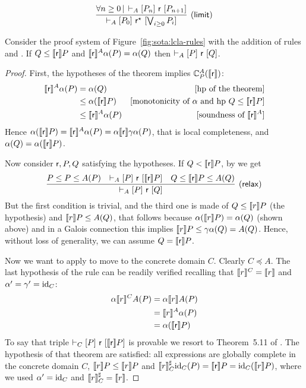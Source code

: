 \[\infer[(\mathsf{limit})]
{\lcl{A}{P_0}{\regr^\kstar}{\bigvee_{i \ge 0}P_i}}
{\forall n \ge 0 \svert \lcl{A}{P_n}{\regr}{P_{n+1}}}
\]
\begin{theorem}\label{th:lcla:refinement-rule-completeness}
	Consider the proof system of Figure~\ref{fig:sota:lcla-rules} with the addition of rules  and . If $Q \le \llbracket\mathsf{r}\rrbracket P$ and $\llbracket\mathsf{r}\rrbracket^A \alpha(P) = \alpha(Q)$ then $\vdash_{A}\nobreak[P]~\mathsf{r}~[Q]$.
\end{theorem}
\begin{proof}
	First, the hypotheses of the theorem implies $\mathbb{C}^{A}_{P}(\llbracket\mathsf{r}\rrbracket)$:
	\begin{align*}
		\llbracket\mathsf{r}\rrbracket^A \alpha(P) & = \alpha(Q)                   & [\text{hp of the theorem}]                                             \\
		                          & \le \alpha(\llbracket\mathsf{r}\rrbracket P)   & [\text{monotonicity of } \alpha \text{ and hp } Q \le \llbracket\mathsf{r}\rrbracket P] \\
		                          & \le \llbracket\mathsf{r}\rrbracket^A \alpha(P) & [\text{soundness of } \llbracket\mathsf{r}\rrbracket^{A}]
	\end{align*}
	Hence $\alpha(\llbracket\mathsf{r}\rrbracket P) = \llbracket\mathsf{r}\rrbracket^A \alpha(P) = \alpha \llbracket\mathsf{r}\rrbracket \gamma \alpha(P)$, that is local completeness, and $\alpha(Q) = \alpha(\llbracket\mathsf{r}\rrbracket P)$.

	Now consider $\mathsf{r}, P, Q$ satisfying the hypotheses. If $Q < \llbracket\mathsf{r}\rrbracket P$, by  we get
	\[
	\infer[(\mathsf{relax})]
	{\lcl{A}{P}{\regr}{Q}}
	{P \le P \le A(P) & \lcl{A}{P}{\regr}{\denot{\regr} P} & Q \leq \denot{\regr} P \le A(Q)}
	\]
	But the first condition is trivial, and the third one is made of $Q \le \llbracket r\rrbracket P$ (the hypothesis) and $\llbracket r\rrbracket P \le A(Q)$, that follows because $\alpha(\llbracket r\rrbracket P) = \alpha(Q)$ (shown above) and in a Galois connection this implies $\llbracket r\rrbracket P \le \gamma \alpha(Q) = A(Q)$. Hence, without loss of generality, we can assume $Q = \llbracket\mathsf{r}\rrbracket P$.

	Now we want to apply  to move to the concrete domain $C$. Clearly $C \preceq A$. The last hypothesis of the rule can be readily verified recalling that $\llbracket r\rrbracket^{C} = \llbracket r\rrbracket$ and $\alpha' = \gamma' = \text{id}_C$:
	\begin{align*}
		\alpha \llbracket r\rrbracket^{C} A(P) & = \alpha \llbracket r\rrbracket A(P)   \\
		                          & = \llbracket r\rrbracket^{A} \alpha(P) \\
		                          & = \alpha(\llbracket\mathsf{r}\rrbracket P)
	\end{align*}
	To say that triple $\vdash_{C}\nobreak[P]~\mathsf{r}~[\llbracket\mathsf{r}\rrbracket P]$ is provable we resort to Theorem~5.11 of \cite{BGGR21}. The hypothesis of that theorem are satisfied: all expressions are globally complete in the concrete domain $C$, $\llbracket r\rrbracket P \le \llbracket r\rrbracket P$ and $\llbracket r\rrbracket^{\sharp}_C \text{id}_C(P) = \llbracket\mathsf{r}\rrbracket P = \text{id}_C(\llbracket r\rrbracket P)$, where we used $\alpha' = \text{id}_C$ and $\llbracket r\rrbracket^{\sharp}_C = \llbracket r\rrbracket$.


\end{proof}
